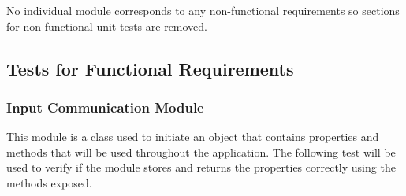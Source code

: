 \documentclass[12pt, titlepage]{article}
\begin{document}
No individual module corresponds to any non-functional requirements so sections for non-functional unit tests are removed.

\subsection{Tests for Functional Requirements}


\subsubsection{Input Communication Module}

This module is a class used to initiate an object that contains properties and methods that will be used throughout the application.
The following test will be used to verify if the module stores and returns the properties correctly using the methods exposed.
\end{document}
